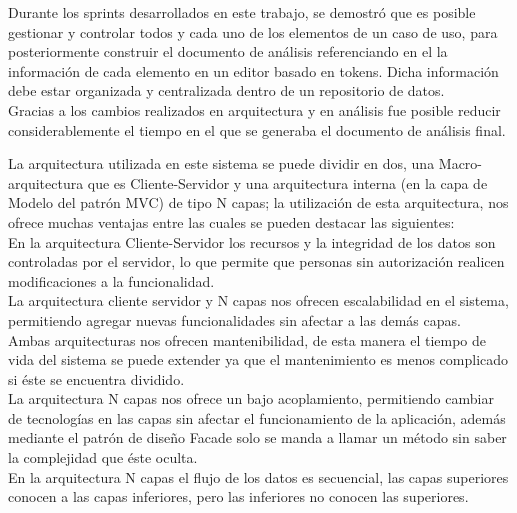 Durante los sprints desarrollados en este trabajo, se demostró que es posible gestionar y controlar todos y cada uno de los elementos de un caso de uso, para posteriormente construir el documento de análisis referenciando en el la información de cada elemento en un editor basado en tokens. Dicha información debe estar organizada y centralizada dentro de un repositorio de datos.\\

Gracias a los cambios realizados en arquitectura y en análisis fue posible reducir considerablemente el tiempo en el que se generaba el documento de análisis final.

La arquitectura utilizada en este sistema se puede dividir en dos, una Macro-arquitectura que es Cliente-Servidor y una arquitectura interna (en la capa de Modelo del patrón MVC) de tipo N capas; la utilización de esta arquitectura, nos ofrece muchas ventajas entre las cuales se pueden destacar las siguientes:\\

En la arquitectura Cliente-Servidor los recursos y la integridad de los datos son controladas por el servidor, lo que permite que personas sin autorización realicen modificaciones a la funcionalidad.\\

La arquitectura cliente servidor y N capas nos ofrecen escalabilidad en el sistema, permitiendo agregar nuevas funcionalidades sin afectar a las demás capas.\\

Ambas arquitecturas nos ofrecen mantenibilidad, de esta manera el tiempo de vida del sistema se puede extender ya que el mantenimiento es menos complicado si éste se encuentra dividido.\\

La arquitectura N capas nos ofrece un bajo acoplamiento, permitiendo cambiar de tecnologías en las capas sin afectar el funcionamiento de la aplicación, además mediante el patrón de diseño Facade solo se manda a llamar un método sin saber la complejidad que éste oculta.\\

En la arquitectura N capas el flujo de los datos es secuencial, las capas superiores conocen a las capas inferiores, pero las inferiores no conocen las superiores.\\

